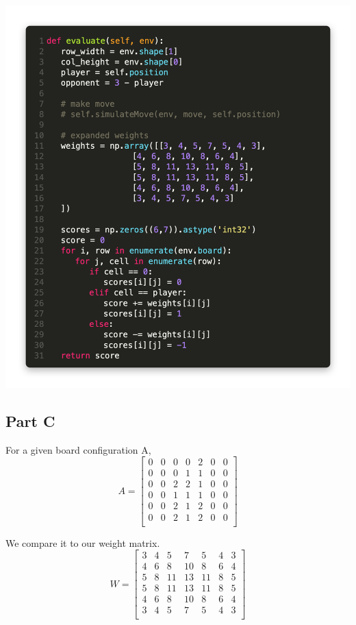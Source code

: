 \documentclass{article}
\begin{document}
\includegraphics[width = \linewidth]{codye.png}

\subsection{Part C}

For a given board configuration A,
\begin{equation*}
    A = \left[ \begin{matrix}
        0 & 0 & 0 & 0 & 2 & 0 & 0 \\
        0 & 0 & 0 & 1 & 1 & 0 & 0 \\
        0 & 0 & 2 & 2 & 1 & 0 & 0 \\
        0 & 0 & 1 & 1 & 1 & 0 & 0 \\
        0 & 0 & 2 & 1 & 2 & 0 & 0 \\
        0 & 0 & 2 & 1 & 2 & 0 & 0 \\
    \end{matrix} \right]
\end{equation*}

We compare it to our weight matrix.
\begin{equation*}
    W = \left[ \begin{matrix}
        3 & 4 & 5 & 7 & 5 & 4 & 3 \\
        4 & 6 & 8 & 10 & 8 & 6 & 4 \\
        5 & 8 & 11 & 13 & 11 & 8 & 5 \\
        5 & 8 & 11 & 13 & 11 & 8 & 5 \\
        4 & 6 & 8 & 10 & 8 & 6 & 4 \\
        3 & 4 & 5 & 7 & 5 & 4 & 3 \\
    \end{matrix} \right]
\end{equation*}
\end{document}
